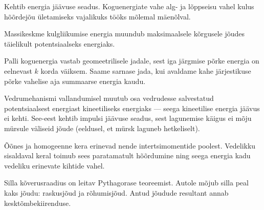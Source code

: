 \documentclass[10pt, twoside]{article}
\begin{document}
{%

\hint
Kehtib energia jäävuse seadus. Koguenergiate vahe alg- ja lõppseisu vahel kulus hõõrdejõu ületamiseks vajalikuks tööks mõlemal mäenõlval.
\probend
\bigskip


\hint
Massikeskme kulgliikumise energia muundub maksimaalsele kõrgusele jõudes täielikult potentsiaalseks energiaks.
\probend
\bigskip


\hint
Palli koguenergia vastab geomeetrilisele jadale, sest iga järgmise põrke energia on eelnevast $k$ korda väiksem. Saame sarnase jada, kui avaldame kahe järjestikuse põrke vahelise aja summaarse energia kaudu.
\probend
\bigskip


\hint
Vedrumehanismi vallandumisel muutub osa vedrudesse salvestatud potentsiaalsest energiast kineetiliseks energiaks --- seega kineetilise energia jäävus ei kehti. See-eest kehtib impulsi jäävuse seadus, sest lagunemise käigus ei mõju mürsule väliseid jõude (eeldusel, et mürsk laguneb hetkeliselt).
\probend
\bigskip


\hint
Õõnes ja homogeenne kera erinevad nende intertsimomentide poolest. Vedelikku sisaldaval keral toimub sees paratamatult hõõrdumine ning seega energia kadu vedeliku erinevate kihtide vahel.
\probend
\bigskip


\hint
Silla kõverusraadius on leitav Pythagorase teoreemist. Autole mõjub silla peal kaks jõudu: raskusjõud ja rõhumisjõud. Antud jõudude resultant annab kesktõmbekiirenduse.
\probend
\bigskip


}
\end{document}
